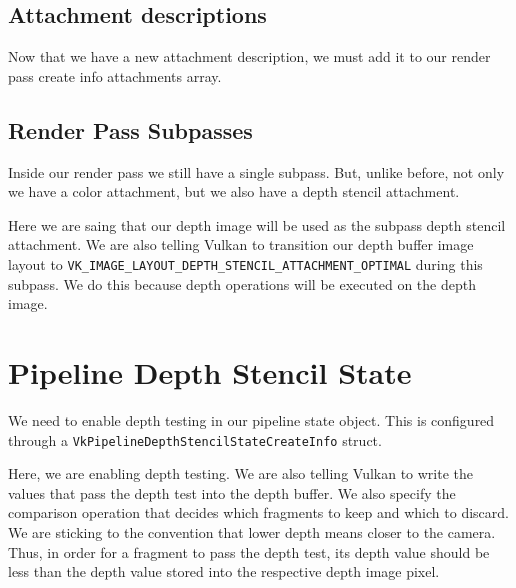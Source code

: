 \subsection{Attachment descriptions}

Now that we have a new attachment description, we must add it to our
render pass create info attachments array.

\begin{minipage}{\linewidth}{\noindent}
    
\end{minipage}

\subsection{Render Pass Subpasses}

Inside our render pass we still have a single subpass.
But, unlike before, not only we have a color attachment, but
we also have a depth stencil attachment.

Here we are saing that our depth image will be used as the subpass depth
stencil attachment.
We are also telling Vulkan to transition our depth buffer image layout to
\texttt{VK\_IMAGE\_LAYOUT\_DEPTH\_STENCIL\_ATTACHMENT\_OPTIMAL} during
this subpass.
We do this because depth operations will be executed
on the depth image.

\begin{minipage}{\linewidth}{\noindent}
    
\end{minipage}

\section{Pipeline Depth Stencil State}

We need to enable depth testing in our pipeline state object.
This is configured through a \texttt{VkPipelineDepthStencilStateCreateInfo}
struct.

Here, we are enabling depth testing.
We are also telling Vulkan to write the values that pass the depth test
into the depth buffer.
We also specify the comparison operation that decides which fragments to
keep and which to discard.
We are sticking to the convention that lower depth means closer to
the camera.
Thus, in order for a fragment to pass the depth test, its depth value should
be less than the depth value stored into the respective depth image pixel.

